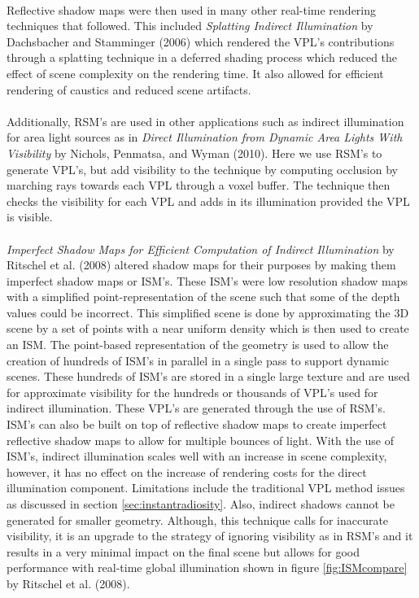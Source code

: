 \paragraph{}
Reflective shadow maps were then used in many other real-time rendering techniques that followed.  This included \textit{Splatting Indirect Illumination} by Dachsbacher and Stamminger (2006) which rendered the VPL's contributions through a splatting technique in a deferred shading process which reduced the effect of scene complexity on the rendering time.  It also allowed for efficient rendering of caustics and reduced scene artifacts.

\paragraph{}
Additionally, RSM's are used in other applications such as indirect illumination for area light sources as in \textit{Direct Illumination from Dynamic Area Lights With Visibility} by Nichols, Penmatsa, and Wyman (2010).  Here we use RSM's to generate VPL's, but add visibility to the technique by computing occlusion by marching rays towards each VPL through a voxel buffer.  The technique then checks the visibility for each VPL and adds in its illumination provided the VPL is visible.

\paragraph{}
\textit{Imperfect Shadow Maps for Efficient Computation of Indirect Illumination} by Ritschel et al. (2008) altered shadow maps for their purposes by making them imperfect shadow maps or ISM's.  These ISM's were low resolution shadow maps with a simplified point-representation of the scene such that some of the depth values could be incorrect.  This simplified scene is done by approximating the 3D scene by a set of points with a near uniform density which is then used to create an ISM.  The point-based representation of the geometry is used to allow the creation of hundreds of ISM's in parallel in a single pass to support dynamic scenes.  These hundreds of ISM's are stored in a single large texture and are used for approximate visibility for the hundreds or thousands of VPL's used for indirect illumination.  These VPL's are generated through the use of RSM's.  ISM's can also be built on top of reflective shadow maps to create imperfect reflective shadow maps to allow for multiple bounces of light.  With the use of ISM's, indirect illumination scales well with an increase in scene complexity, however, it has no effect on the increase of rendering costs for the direct illumination component.  Limitations include the traditional VPL method issues as discussed in section \ref{sec:instantradiosity}.  Also, indirect shadows cannot be generated for smaller geometry.  Although, this technique calls for inaccurate visibility, it is an upgrade to the strategy of ignoring visibility as in RSM's and it results in a very minimal impact on the final scene but allows for good performance with real-time global illumination shown in figure \ref{fig:ISMcompare} by Ritschel et al. (2008).

